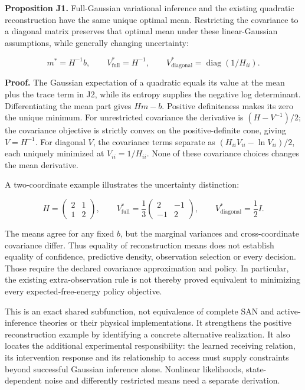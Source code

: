 \documentclass[
  american,
  11pt,
  letterpaper,
]{article}
\begin{document}
\textbf{Proposition J1.} Full-Gaussian variational inference and the existing quadratic reconstruction have the same unique optimal mean. Restricting the covariance to a diagonal matrix preserves that optimal mean under these linear-Gaussian assumptions, while generally changing uncertainty:

\begin{equation}
m^*=H^{-1}b,\qquad
V^*_{\mathrm{full}}=H^{-1},\qquad
V^*_{\mathrm{diagonal}}=\operatorname{diag}(1/H_{ii}).
\tag{J3}
\end{equation}

\textbf{Proof.} The Gaussian expectation of a quadratic equals its value at the mean plus the trace term in J2, while its entropy supplies the negative log determinant. Differentiating the mean part gives \(Hm-b\). Positive definiteness makes its zero the unique minimum. For unrestricted covariance the derivative is \((H-V^{-1})/2\); the covariance objective is strictly convex on the positive-definite cone, giving \(V=H^{-1}\). For diagonal \(V\), the covariance terms separate as \((H_{ii}V_{ii}-\ln V_{ii})/2\), each uniquely minimized at \(V_{ii}=1/H_{ii}\). None of these covariance choices changes the mean derivative.

A two-coordinate example illustrates the uncertainty distinction:

\begin{equation}
H=\begin{pmatrix}2&1\\1&2\end{pmatrix},\qquad
V^*_{\mathrm{full}}=\frac13\begin{pmatrix}2&-1\\-1&2\end{pmatrix},\qquad
V^*_{\mathrm{diagonal}}=\frac12 I.
\tag{J4}
\end{equation}

The means agree for any fixed \(b\), but the marginal variances and cross-coordinate covariance differ. Thus equality of reconstruction means does not establish equality of confidence, predictive density, observation selection or every decision. Those require the declared covariance approximation and policy. In particular, the existing extra-observation rule is not thereby proved equivalent to minimizing every expected-free-energy policy objective.

This is an exact shared subfunction, not equivalence of complete SAN and active-inference theories or their physical implementations. It strengthens the positive reconstruction example by identifying a concrete alternative realization. It also locates the additional experimental responsibility: the learned receiving relation, its intervention response and its relationship to access must supply constraints beyond successful Gaussian inference alone. Nonlinear likelihoods, state-dependent noise and differently restricted means need a separate derivation.
\end{document}
